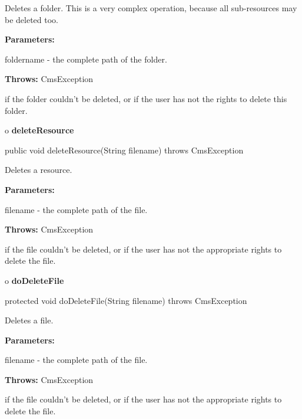 \begin{description}
\htmlDD Deletes a folder. \htmlBR
This is a very complex operation, because all sub-resources may be deleted
too.

\begin{description}
\item {\bf Parameters:}

foldername - the complete path of the folder.
\item {\bf Throws:} CmsException

if the folder couldn't be deleted, or if the user has not the rights to delete
this folder.
\end{description}

\end{description}

o {\bf deleteResource}

\begin{PRE}
 public void deleteResource(String filename) throws CmsException
\end{PRE}

\begin{description}
\htmlDD Deletes a resource.

\begin{description}
\item {\bf Parameters:}

filename - the complete path of the file.
\item {\bf Throws:} CmsException

if the file couldn't be deleted, or if the user has not the appropriate rights
to delete the file.
\end{description}

\end{description}

o {\bf doDeleteFile}

\begin{PRE}
 protected void doDeleteFile(String filename) throws CmsException
\end{PRE}

\begin{description}
\htmlDD Deletes a file.

\begin{description}
\item {\bf Parameters:}

filename - the complete path of the file.
\item {\bf Throws:} CmsException

if the file couldn't be deleted, or if the user has not the appropriate rights
to delete the file.
\end{description}

\end{description}

